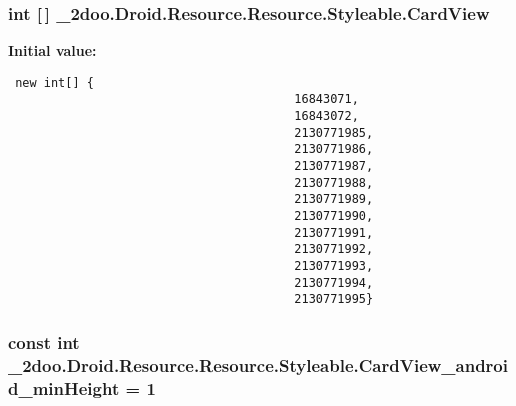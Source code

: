 \hypertarget{class__2doo_1_1_droid_1_1_resource_1_1_styleable_794081996344323986f0b6b50748cbd4}{
\subsubsection[{CardView}]{\setlength{\rightskip}{0pt plus 5cm}int \mbox{[}$\,$\mbox{]} \_\-2doo.Droid.Resource.Resource.Styleable.CardView}}
\label{class__2doo_1_1_droid_1_1_resource_1_1_styleable_794081996344323986f0b6b50748cbd4}


\textbf{Initial value:}

\begin{Code}\begin{verbatim} new int[] {
                                        16843071,
                                        16843072,
                                        2130771985,
                                        2130771986,
                                        2130771987,
                                        2130771988,
                                        2130771989,
                                        2130771990,
                                        2130771991,
                                        2130771992,
                                        2130771993,
                                        2130771994,
                                        2130771995}
\end{verbatim}
\end{Code}
\hypertarget{class__2doo_1_1_droid_1_1_resource_1_1_styleable_06c42120bb9cad99ae45e7adaee490e4}{
\subsubsection[{CardView\_\-android\_\-minHeight}]{\setlength{\rightskip}{0pt plus 5cm}const int \_\-2doo.Droid.Resource.Resource.Styleable.CardView\_\-android\_\-minHeight = 1}}
\label{class__2doo_1_1_droid_1_1_resource_1_1_styleable_06c42120bb9cad99ae45e7adaee490e4}


